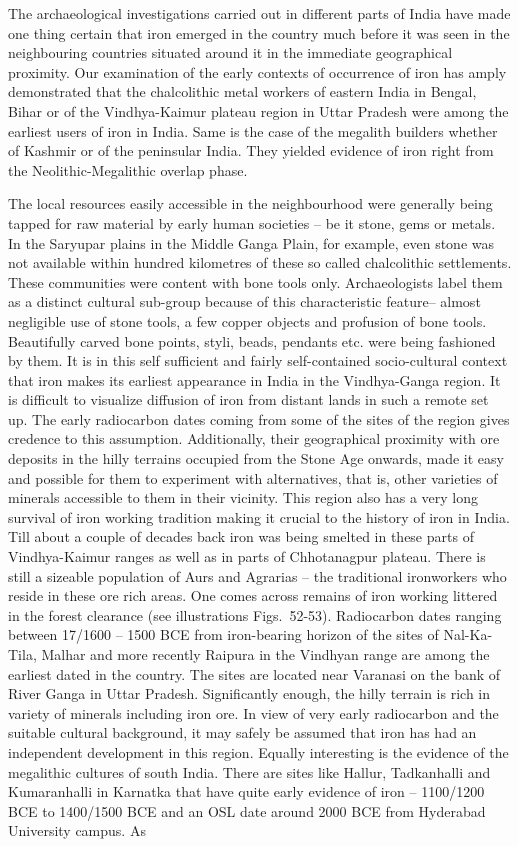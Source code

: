 The archaeological investigations carried out in different parts of India have made one thing certain that iron emerged in the country much before it was seen in the neighbouring countries situated around it in the immediate geographical proximity. Our examination of the early contexts of occurrence of iron has amply demonstrated that the chalcolithic metal workers of eastern India in Bengal, Bihar or of the Vindhya-Kaimur plateau region in Uttar Pradesh were among the earliest users of iron in India. Same is the case of the megalith builders whether of Kashmir or of the peninsular India. They yielded evidence of iron right from the Neolithic-Megalithic overlap phase.

The local resources easily accessible in the neighbourhood were generally being tapped for raw material by early human societies – be it stone, gems or metals. In the Saryupar plains in the Middle Ganga Plain, for example, even stone was not available within hundred kilometres of these so called chalcolithic settlements. These communities were content with bone tools only. Archaeologists label them as a distinct cultural sub-group because of this characteristic feature– almost negligible use of stone tools, a few copper objects and profusion of bone tools. Beautifully carved bone points, styli, beads, pendants etc. were being fashioned by them. It is in this self sufficient and fairly self-contained socio-cultural context that iron makes its earliest appearance in India in the Vindhya-Ganga region. It is difficult to visualize diffusion of iron from distant lands in such a remote set up. The early radiocarbon dates coming from some of the sites of the region gives credence to this assumption. Additionally, their geographical proximity with ore deposits in the hilly terrains occupied from the Stone Age onwards, made it easy and possible for them to experiment with alternatives, that is, other varieties of minerals accessible to them in their vicinity. This region also has a very long survival of iron working tradition making it crucial to the history of iron in India. Till about a couple of decades back iron was being smelted in these parts of Vindhya-Kaimur ranges as well as in parts of Chhotanagpur plateau. There is still a sizeable population of Aurs and Agrarias – the traditional ironworkers who reside in these ore rich areas. One comes across remains of iron working littered in the forest clearance (see illustrations Figs.~52-53). Radiocarbon dates ranging between 17/1600 – 1500 BCE from iron-bearing horizon of the sites of Nal-Ka-Tila,  Malhar and more recently Raipura in the Vindhyan range are among the earliest dated in the country. The sites are located near Varanasi on the bank of River Ganga in Uttar Pradesh. Significantly enough, the hilly terrain is rich in variety of minerals including iron ore. In view of very early radiocarbon and the suitable cultural background, it may safely be assumed that iron has had an independent development in this region. Equally interesting is the evidence of the megalithic cultures of south India. There are sites like Hallur, Tadkanhalli and Kumaranhalli in Karnatka that have quite early evidence of iron – 1100/1200 BCE to 1400/1500 BCE and an OSL date around 2000 BCE from Hyderabad University campus. As 